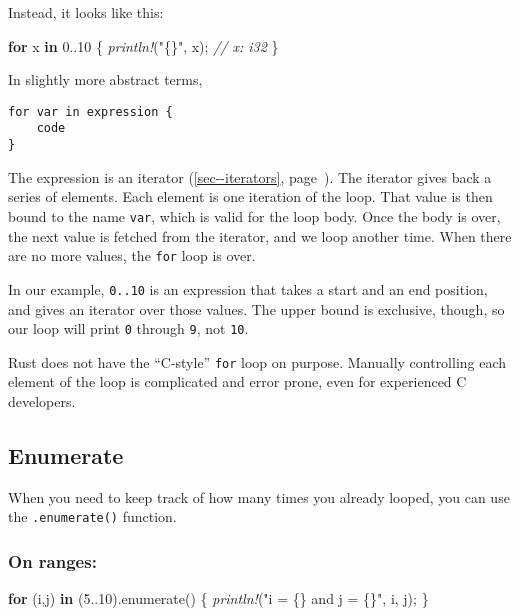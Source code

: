 \documentclass[a4paper,]{book}
\renewcommand*{\hyperref}[2][\ar]{%
  \def\ar{#2}%
  #2 (\autoref{#1}, page~\pageref{#1})}
\newenvironment{Shaded}{\begin{snugshade}}{\end{snugshade}}
\newcommand{\KeywordTok}[1]{\textcolor[rgb]{0.13,0.29,0.53}{\textbf{{#1}}}}
\newcommand{\DecValTok}[1]{\textcolor[rgb]{0.00,0.00,0.81}{{#1}}}
\newcommand{\StringTok}[1]{\textcolor[rgb]{0.31,0.60,0.02}{{#1}}}
\newcommand{\CommentTok}[1]{\textcolor[rgb]{0.56,0.35,0.01}{\textit{{#1}}}}
\newcommand{\PreprocessorTok}[1]{\textcolor[rgb]{0.56,0.35,0.01}{\textit{{#1}}}}
\newcommand{\NormalTok}[1]{{#1}}
\begin{document}
Instead, it looks like this:

\begin{Shaded}
\begin{Highlighting}[]
\KeywordTok{for} \NormalTok{x }\KeywordTok{in} \DecValTok{0.}\NormalTok{.}\DecValTok{10} \NormalTok{\{}
    \PreprocessorTok{println!}\NormalTok{(}\StringTok{"\{\}"}\NormalTok{, x); }\CommentTok{// x: i32}
\NormalTok{\}}
\end{Highlighting}
\end{Shaded}

In slightly more abstract terms,

\begin{verbatim}
for var in expression {
    code
}
\end{verbatim}

The expression is an \hyperref[sec--iterators]{iterator}. The iterator
gives back a series of elements. Each element is one iteration of the
loop. That value is then bound to the name \texttt{var}, which is valid
for the loop body. Once the body is over, the next value is fetched from
the iterator, and we loop another time. When there are no more values,
the \texttt{for} loop is over.

In our example, \texttt{0..10} is an expression that takes a start and
an end position, and gives an iterator over those values. The upper
bound is exclusive, though, so our loop will print \texttt{0} through
\texttt{9}, not \texttt{10}.

Rust does not have the ``C-style'' \texttt{for} loop on purpose.
Manually controlling each element of the loop is complicated and error
prone, even for experienced C developers.

\subsection{Enumerate}\label{enumerate}

When you need to keep track of how many times you already looped, you
can use the \texttt{.enumerate()} function.

\subsubsection{On ranges:}\label{on-ranges}

\begin{Shaded}
\begin{Highlighting}[]
\KeywordTok{for} \NormalTok{(i,j) }\KeywordTok{in} \NormalTok{(}\DecValTok{5.}\NormalTok{.}\DecValTok{10}\NormalTok{).enumerate() \{}
    \PreprocessorTok{println!}\NormalTok{(}\StringTok{"i = \{\} and j = \{\}"}\NormalTok{, i, j);}
\NormalTok{\}}
\end{Highlighting}
\end{Shaded}
\end{document}
